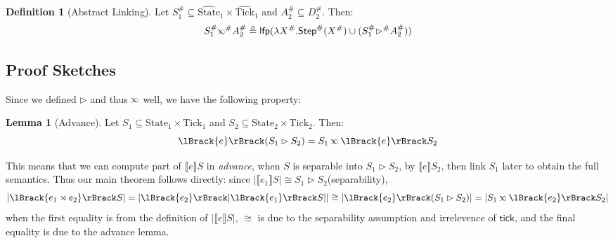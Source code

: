 \documentclass{article}
\theoremstyle{definition}
\newtheorem{definition}{Definition}[section]
\newtheorem{lem}{Lemma}[section]
\newcommand*{\A}[1]{\widehat{#1}}
\newcommand*{\Abs}[1]{{#1}^{\#}}
\newcommand*{\State}{\text{State}}
\newcommand*{\Tick}{\text{Tick}}
\newcommand*{\Step}{\mathsf{Step}}
\newcommand*{\semlink}{\mathbin{\rotatebox[origin=c]{180}{$\propto$}}}
\newcommand*{\link}[2]{{#1}\rtimes{#2}}
\newcommand*{\sembracket}[1]{\lBrack{#1}\rBrack}
\newcommand*{\tick}{\mathsf{tick}}
\begin{document}
\begin{definition}[Abstract Linking]
  Let $\Abs{S}_1\subseteq\A\State_1\times\A\Tick_1$ and $\Abs{A}_2\subseteq \Abs{D}_2$.
  Then:
  \[
    \Abs{S}_1\Abs\semlink\Abs{A}_2\triangleq
    \mathsf{lfp}(\lambda \Abs{X}.\Abs\Step(\Abs{X})\cup(\Abs{S}_1\Abs\rhd \Abs{A}_2))
  \]
\end{definition}

\subsection{Proof Sketches}
Since we defined $\rhd$ and thus $\semlink$ well, we have the following property:
\begin{lem}[Advance]
  Let $S_1\subseteq\State_1\times\Tick_1$ and $S_2\subseteq\State_2\times\Tick_2$. Then:
  \[
    \sembracket{e}(S_1\rhd S_2)=S_1\semlink\sembracket{e}S_2
  \]
\end{lem}
This means that we can compute part of $\sembracket{e}S$ in \emph{advance}, when $S$ is {separable} into $S_1\rhd S_2$, by $\sembracket{e}S_2$, then link $S_1$ later to obtain the full semantics.
Thus our main theorem follows directly: since $|\sembracket{e_1}S|\cong S_1\rhd S_2$(separability),
\[
  |\sembracket{\link{e_1}{e_2}}S|=|\sembracket{e_2}|\sembracket{e_1}S||\cong|\sembracket{e_2}(S_1\rhd S_2)|=|S_1\semlink\sembracket{e_2}S_2|
\]
when the first equality is from the definition of $|\sembracket{e}S|$, $\cong$ is due to the separability assumption and irrelevence of $\tick$, and the final equality is due to the advance lemma.
\end{document}
